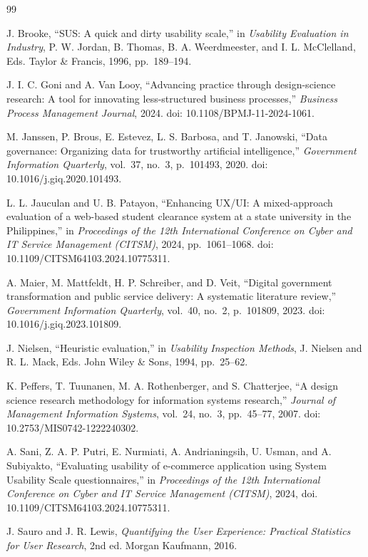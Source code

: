 \documentclass[conference]{IEEEtran}
\begin{document}
\begin{thebibliography}{99}

 J. Brooke, ``SUS: A quick and dirty usability scale,'' in
\emph{Usability Evaluation in Industry}, P. W. Jordan, B. Thomas, B. A. Weerdmeester,
and I. L. McClelland, Eds. Taylor \& Francis, 1996, pp.~189--194.

 J. I. C. Goni and A. Van Looy, ``Advancing practice through design-science
research: A tool for innovating less-structured business processes,''
\emph{Business Process Management Journal}, 2024.
doi: 10.1108/BPMJ-11-2024-1061.

 M. Janssen, P. Brous, E. Estevez, L. S. Barbosa, and T. Janowski,
``Data governance: Organizing data for trustworthy artificial intelligence,''
\emph{Government Information Quarterly}, vol.~37, no.~3, p.~101493, 2020.
doi: 10.1016/j.giq.2020.101493.

 L. L. Jauculan and U. B. Patayon, ``Enhancing UX/UI: A mixed-approach
evaluation of a web-based student clearance system at a state university in the
Philippines,'' in \emph{Proceedings of the 12th International Conference on Cyber and IT
Service Management (CITSM)}, 2024, pp.~1061--1068.
doi: 10.1109/CITSM64103.2024.10775311.

 A. Maier, M. Mattfeldt, H. P. Schreiber, and D. Veit, ``Digital government
transformation and public service delivery: A systematic literature review,''
\emph{Government Information Quarterly}, vol.~40, no.~2, p.~101809, 2023.
doi: 10.1016/j.giq.2023.101809.

 J. Nielsen, ``Heuristic evaluation,'' in \emph{Usability Inspection Methods},
J. Nielsen and R. L. Mack, Eds. John Wiley \& Sons, 1994, pp.~25--62.

 K. Peffers, T. Tuunanen, M. A. Rothenberger, and S. Chatterjee,
``A design science research methodology for information systems research,''
\emph{Journal of Management Information Systems}, vol.~24, no.~3, pp.~45--77, 2007.
doi: 10.2753/MIS0742-1222240302.

 A. Sani, Z. A. P. Putri, E. Nurmiati, A. Andrianingsih, U. Usman, and A.
Subiyakto, ``Evaluating usability of e-commerce application using System Usability Scale
questionnaires,'' in \emph{Proceedings of the 12th International Conference on Cyber and IT
Service Management (CITSM)}, 2024, doi. 10.1109/CITSM64103.2024.10775311.

 J. Sauro and J. R. Lewis, \emph{Quantifying the User Experience: Practical
Statistics for User Research}, 2nd ed. Morgan Kaufmann, 2016.


\end{thebibliography}
\end{document}
